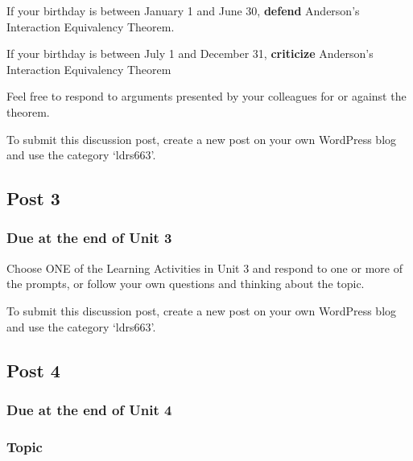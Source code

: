 \documentclass[
]{book}
\begin{document}
If your birthday is between January 1 and June 30, \textbf{defend} Anderson's Interaction Equivalency Theorem.

If your birthday is between July 1 and December 31, \textbf{criticize} Anderson's Interaction Equivalency Theorem

Feel free to respond to arguments presented by your colleagues for or against the theorem.

To submit this discussion post, create a new post on your own WordPress blog and use the category `ldrs663'.

\hypertarget{post-3}{%
\subsection*{Post 3}\label{post-3}}

\hypertarget{due-at-the-end-of-unit-3}{%
\subsubsection*{Due at the end of Unit 3}\label{due-at-the-end-of-unit-3}}

Choose ONE of the Learning Activities in Unit 3 and respond to one or more of the prompts, or follow your own questions and thinking about the topic.

To submit this discussion post, create a new post on your own WordPress blog and use the category `ldrs663'.

\hypertarget{post-4}{%
\subsection*{Post 4}\label{post-4}}

\hypertarget{due-at-the-end-of-unit-4}{%
\subsubsection*{Due at the end of Unit 4}\label{due-at-the-end-of-unit-4}}

\hypertarget{topic-1}{%
\subsubsection*{Topic}\label{topic-1}}
\end{document}

